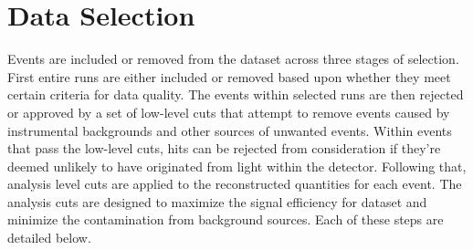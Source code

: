 %
%

\chapter{Data Selection}
\label{sec:data_selection}
Events are included or removed from the dataset across three stages of selection.
First entire runs are either included or removed based upon whether they meet
certain criteria for data quality.
The events within selected runs are then rejected or approved by a set
of low-level cuts that attempt to remove events caused by instrumental
backgrounds and other sources of unwanted events.
Within events that pass the low-level cuts, hits can be rejected from consideration
if they're deemed unlikely to have originated from light within the detector.
Following that, analysis level cuts are applied to the reconstructed quantities
for each event.
The analysis cuts are designed to maximize the signal efficiency for dataset and minimize the
contamination from background sources.
Each of these steps are detailed below.

